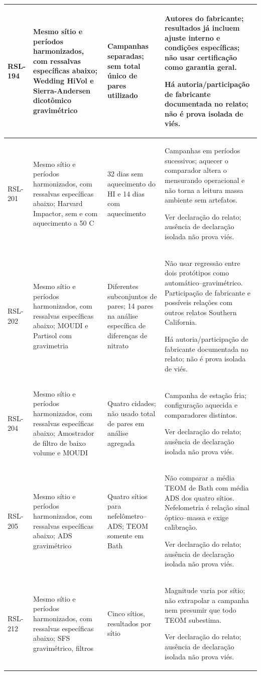 \begin{longtable}{|P{0.12\textwidth}|P{0.28\textwidth}|P{0.28\textwidth}|P{\arrayrulewidth\relax}|}
RSL-194 & Mesmo sítio e períodos harmonizados, com ressalvas específicas abaixo; Wedding HiVol e Sierra-Andersen dicotômico gravimétrico & Campanhas separadas; sem total único de pares utilizado & Autores do fabricante; resultados já incluem ajuste interno e condições específicas; não usar certificação como garantia geral.\par\medskip Há autoria/participação de fabricante documentada no relato; não é prova isolada de viés.\\\hline
RSL-201 & Mesmo sítio e períodos harmonizados, com ressalvas específicas abaixo; Harvard Impactor, sem e com aquecimento a 50 \textdegree{}C & 32 dias sem aquecimento do HI e 14 dias com aquecimento & Campanhas em períodos sucessivos; aquecer o comparador altera o mensurando operacional e não torna a leitura massa ambiente sem artefatos.\par\medskip Ver declaração do relato; ausência de declaração isolada não prova viés.\\\hline
RSL-202 & Mesmo sítio e períodos harmonizados, com ressalvas específicas abaixo; MOUDI e Partisol com gravimetria & Diferentes subconjuntos de pares; 14 pares na análise específica de diferenças de nitrato & Não usar regressão entre dois protótipos como automático--gravimétrico. Participação de fabricante e possíveis relações com outros relatos Southern California.\par\medskip Há autoria/participação de fabricante documentada no relato; não é prova isolada de viés.\\\hline
RSL-204 & Mesmo sítio e períodos harmonizados, com ressalvas específicas abaixo; Amostrador de filtro de baixo volume e MOUDI & Quatro cidades; não usado total de pares em análise agregada & Campanha de estação fria; configuração aquecida e comparadores distintos.\par\medskip Ver declaração do relato; ausência de declaração isolada não prova viés.\\\hline
RSL-205 & Mesmo sítio e períodos harmonizados, com ressalvas específicas abaixo; ADS gravimétrico & Quatro sítios para nefelômetro--ADS; TEOM somente em Bath & Não comparar a média TEOM de Bath com média ADS dos quatro sítios. Nefelometria é relação sinal óptico--massa e exige calibração.\par\medskip Ver declaração do relato; ausência de declaração isolada não prova viés.\\\hline
RSL-212 & Mesmo sítio e períodos harmonizados, com ressalvas específicas abaixo; SFS gravimétrico, filtros & Cinco sítios, resultados por sítio & Magnitude varia por sítio; não extrapolar a campanha nem presumir que todo TEOM subestima.\par\medskip Ver declaração do relato; ausência de declaração isolada não prova viés.\\\hline

\end{longtable}
